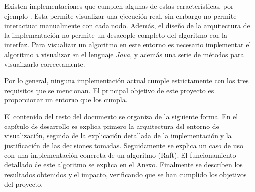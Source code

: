 Existen implementaciones que cumplen algunas de estas características, por ejemplo \cite{MOSES200497}. Esta permite visualizar una ejecución real, sin embargo no permite interactuar manualmente con cada nodo. Además, el diseño de la arquitectura de la implementación no permite un desacople completo del algoritmo con la interfaz. Para visualizar un algoritmo en este entorno es necesario implementar el algoritmo a visualizar en el lenguaje \textit{Java}, y además una serie de métodos para visualizarlo correctamente.

Por lo general, ninguna implementación actual cumple estrictamente con los tres requisitos que se mencionan. El principal objetivo de este proyecto es proporcionar un entorno que los cumpla.

\newpage

El contenido del resto del documento se organiza de la siguiente forma. En el capítulo de desarrollo se explica primero la arquitectura del entorno de visualización, seguida de la explicación detallada de la implementación y la justificación de las decisiones tomadas. Seguidamente se explica un caso de uso con una implementación concreta de un algoritmo (Raft). El funcionamiento detallado de este algoritmo se explica en el Anexo. Finalmente se describen los resultados obtenidos y el impacto, verificando que se han cumplido los objetivos del proyecto.



